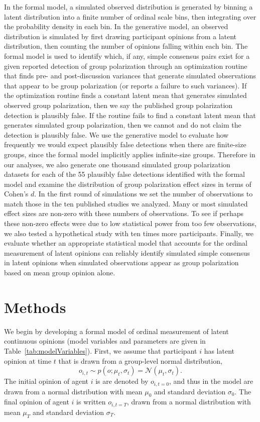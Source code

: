 \documentclass[
  abstract]{article}
\begin{document}
In the formal model, a simulated observed distribution is generated by
binning a latent distribution into a finite number of ordinal scale
bins, then integrating over the probability density in each bin. In the
generative model, an observed distribution is simulated by first drawing
participant opinions from a latent distribution, then counting the
number of opinions falling within each bin. The formal model is used to
identify which, if any, simple consensus pairs exist for a given
reported detection of group polarization through an optimization routine
that finds pre- and post-discussion variances that generate simulated
observations that appear to be group polarization (or reports a failure
to such variances). If the optimization routine finds a constant latent
mean that generates simulated observed group polarization, then we say
the published group polarization detection is plausibly false. If the
routine fails to find a constant latent mean that generates simulated
group polarization, then we cannot and do not claim the detection is
plausibly false. We use the generative model to evaluate how frequently
we would expect plausibly false detections when there are finite-size
groups, since the formal model implicitly applies infinite-size groups.
Therefore in our analyses, we also generate one thousand simulated group
polarization datasets for each of the 55 plausibly false detections
identified with the formal model and examine the distribution of group
polarization effect sizes in terms of Cohen's \(d\). In the first round
of simulations we set the number of observations to match those in the
ten published studies we analyzed. Many or most simulated effect sizes
are non-zero with these numbers of observations. To see if perhaps these
non-zero effects were due to low statistical power from too few
observations, we also tested a hypothetical study with ten times more
participants. Finally, we evaluate whether an appropriate statistical
model that accounts for the ordinal measurement of latent opinions can
reliably identify simulated simple consensus in latent opinions when
simulated observations appear as group polarization based on mean group
opinion alone.

\section{Methods}\label{methods}

We begin by developing a formal model of ordinal measurement of latent
continuous opinions (model variables and parameters are given in
Table~\ref{tab:modelVariables}). First, we assume that participant $i$ has
latent opinion at time $t$ that is drawn from a group-level normal distribution,
\begin{equation}
  o_{i,t} \sim p(o; \mu_t, \sigma_t) = \mathcal{N}(\mu_t, \sigma_t).
  \label{eq:opinionDistribution}
\end{equation} 
\noindent 
The initial opinion of agent $i$ is are denoted by $o_{i,t=0}$, and thus
in the model are drawn from a normal distribution with mean $\mu_0$ and standard
deviation $\sigma_0$. The final opinion of agent $i$ is written $o_{i,t=T}$,
drawn from a normal distribution with mean $\mu_T$ and standard deviation
$\sigma_T$.
\end{document}

